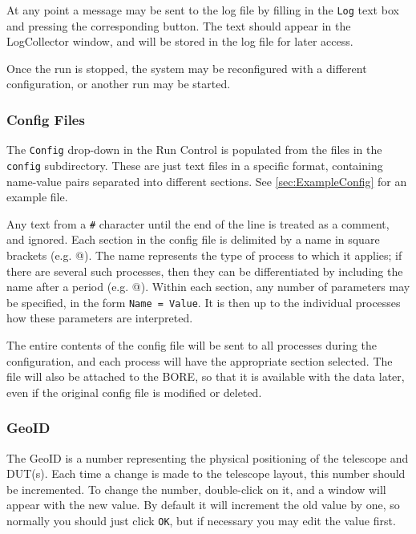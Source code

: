 At any point a message may be sent to the log file by filling in the \texttt{Log} text box and pressing the corresponding button.
The text should appear in the LogCollector window, and will be stored in the log file for later access.

Once the run is stopped, the system may be reconfigured with a different configuration, or another run may be started.

\subsubsection{Config Files}\label{sec:ConfigFiles}
The \texttt{Config} drop-down in the Run Control is populated from the files in the \texttt{config} subdirectory.
These are just text files in a specific format, containing name-value pairs separated into different sections.
See \autoref{sec:ExampleConfig} for an example file.

Any text from a \texttt{\#} character until the end of the line is treated as a comment, and
ignored.  Each section in the config file is delimited by a name in square brackets
(e.g. \verb@[RunControl]@).  The name represents the type of process to which it applies; if there
are several such processes, then they can be differentiated by including the name after a period
(e.g. @).  Within each section, any number of parameters may be specified,
in the form \mbox{\texttt{Name = Value}}.  It is then up to the individual processes how these
parameters are interpreted.

The entire contents of the config file will be sent to all processes during the configuration, and
each process will have the appropriate section selected.  The file will also be attached to the
\gls{BORE}, so that it is available with the data later, even if the original config file is
modified or deleted.

\subsubsection{GeoID}\label{sec:GeoID}
The GeoID is a number representing the physical positioning of the telescope and DUT(s).
Each time a change is made to the telescope layout, this number should be incremented.
To change the number, double-click on it, and a window will appear with the new value.
By default it will increment the old value by one, so normally you should just click \texttt{OK},
but if necessary you may edit the value first.

